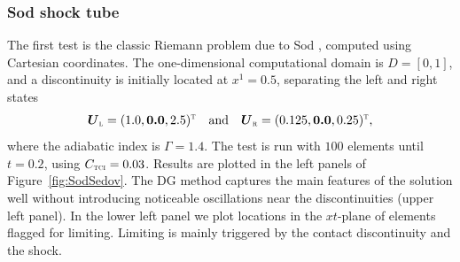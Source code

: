 \documentclass[letterpaper]{jpconf}
\newcommand{\vect}[1]{\boldsymbol{#1}}
\newcommand{\trans}{\textnormal{\tiny\textsc{T}}}
\newcommand{\leftState}{\textnormal{\tiny\textsc{L}}}
\newcommand{\rightState}{\textnormal{\tiny\textsc{R}}}
\newcommand{\TCI}{\textnormal{\tiny\textsc{TCI}}}
\begin{document}
\subsubsection{Sod shock tube}

The first test is the classic Riemann problem due to Sod \cite{sod_1978}, computed using Cartesian coordinates.  
The one-dimensional computational domain is $D=[0,1]$, and a discontinuity is initially located at $x^{1}=0.5$, separating the left and right states
\begin{equation*}
  \vect{U}_{\leftState}=(1.0,\vect{0.0},2.5)^{\trans}\quad\text{and}\quad
  \vect{U}_{\rightState}=(0.125,\vect{0.0},0.25)^{\trans},
\end{equation*}
where the adiabatic index is $\Gamma=1.4$.  
The test is run with $100$ elements until $t=0.2$, using $C_{\TCI}=0.03$.  
Results are plotted in the left panels of Figure~\ref{fig:SodSedov}.  
The DG method captures the main features of the solution well without introducing noticeable oscillations near the discontinuities (upper left panel).  
In the lower left panel we plot locations in the $xt$-plane of elements flagged for limiting.  
Limiting is mainly triggered by the contact discontinuity and the shock.  
\end{document}
